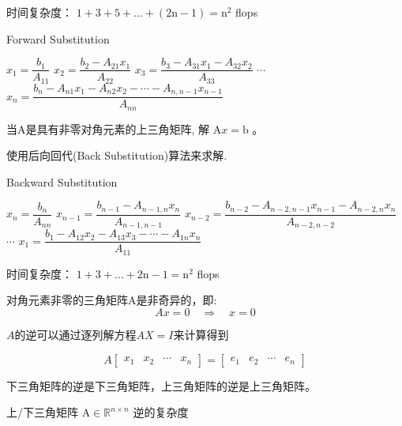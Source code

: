 时间复杂度： $ 1+3+5+\ldots+(2 \mathrm{n}-1)=\mathrm{n}^{2} $ flops

\begin{algorithm}[htbp]
    \caption{Forward Substitution}
    $ x_{1}= \dfrac{b_{1} }{A_{11} }  $\;
$ x_{2}=\dfrac{b_{2}-A_{21} x_{1}}{A_{22}}$\;
$  x_{3} =\dfrac{b_{3}-A_{31} x_{1}-A_{32} x_{2}}{A_{33}} $ \;
    $\cdots$  \;
    $x_{n} =
    \dfrac{b_{n}-A_{n 1} x_{1}-A_{n 2} x_{2}-\cdots-A_{n, n-1} x_{n-1}}{A_{n n}} $\;
\end{algorithm}

\begin{problem}
    当A是具有非零对角元素的上三角矩阵, 解 $ \mathrm{A} x=\mathrm{b} $ 。
\end{problem}

使用后向回代(Back Substitution)算法来求解.

\begin{algorithm}[htbp]
    \caption{Backward Substitution}

    $ x_{n}= \dfrac{b_{n}}{A_{n n}} $\;
    $ x_{n-1}= \dfrac{b_{n-1}-A_{n-1, n} x_{n}}{A_{n-1, n-1}} $ \;
    $ x_{n-2}= \dfrac{b_{n-2}-A_{n-2, n-1} x_{n-1}-A_{n-2, n} x_{n}}{ A_{n-2, n-2}} $\;
    $\cdots$\;
    $ x_{1}=\dfrac{b_{1}-A_{12} x_{2}-A_{13} x_{3}-\cdots-A_{1 n} x_{n}}{A_{11}}  $\;
\end{algorithm}

时间复杂度： $ 1+3+\ldots+2 \mathrm{n}-1=\mathrm{n}^{2} $ flops

\begin{theorem}
    对角元素非零的三角矩阵A是非奇异的，即:
$$
A x=0 \quad \Rightarrow \quad x=0
$$
\end{theorem}

\begin{theorem}[高斯消元法]
    $A$的逆可以通过逐列解方程$AX=I$来计算得到

    $$ A\left[\begin{array}{llll}x_{1} & x_{2} & \cdots & x_{n}\end{array}\right]=\left[\begin{array}{llll}e_{1} & e_{2} & \cdots & e_{n}\end{array}\right] $$
\end{theorem}

\begin{theorem}
    下三角矩阵的逆是下三角矩阵，上三角矩阵的逆是上三角矩阵。
\end{theorem}

上/下三角矩阵 $ \mathrm{A} \in \mathbb{R}^{n \times n} $ 逆的复杂度

